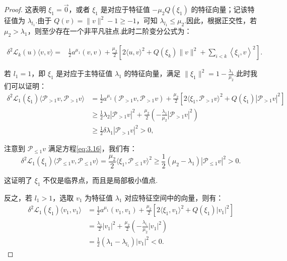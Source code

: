 \begin{proof}
这表明 $\xi_{1}=\vec{0}$，或者 $\xi_{1}$ 是对应于特征值 $-\mu_{2}Q(\xi_{1})$ 的特征向量；记该特征值为 $\lambda_{l_{1}}$.由于 $Q(v)=\|v\|^{2}-1\geq -1$，可知 $\lambda_{l_{1}}\leq \mu_{2}$.因此，根据正交性，若 $\mu_{2}>\lambda_{1}$，则至少存在一个非平凡驻点.此时二阶变分公式为：

\begin{equation*}
\begin{aligned}
\delta^{2} \mathcal{L}_{k}(u)\langle v,v\rangle=& \frac{1}{2}a^{\mu_{1}}(v,v) +\frac{\mu_{2}}{2}\left[2\langle u, v\rangle^{2}+Q(\xi_{k})\|v\|^{2}+\sum_{i<k}\left\langle\xi_{i}, v\right\rangle^{2}\right].
\end{aligned}
\end{equation*}

若 $l_{1}=1$，即 $\xi_{1}$ 是对应于主特征值 $\lambda_{1}$ 的特征向量，满足 $\|\xi_{1}\|^2=1-\frac{\lambda_{1}}{\mu_{2}}$.此时我们可以证明：
$$\begin{aligned}
\delta^{2} \mathcal{L}_{1}(\xi_1)\langle\mathcal{P}_{>1}v,\mathcal{P}_{>1}v\rangle
&=\frac{1}{2}a^{\mu_{1}}(\mathcal{P}_{>1}v,\mathcal{P}_{>1}v)+\frac{\mu_{2}}{2}\left[2\langle\xi_1, \mathcal{P}_{>1}v\rangle^{2}+Q(\xi_{1})|\mathcal{P}_{>1}v|^{2}\right]\\
&\geq\frac{1}{2}\lambda_{2}|\mathcal{P}_{>1}v|^{2}+\frac{\mu_{2}}{2}\left(-\frac{\lambda_{1}}{\mu_{2}}|\mathcal{P}_{>1}v|^{2}\right)\\
&\geq\frac{1}{2}\delta\lambda_{1}|\mathcal{P}_{>1}v|^{2}>0,
\end{aligned}$$

注意到 $\mathcal{P}_{\leq 1}v$ 满足方程\eqref{eq:3.16}，我们有：
\begin{equation}\label{eq:3.20}
\delta^{2} \mathcal{L}_{1}(\xi_1)\langle\mathcal{P}_{\leq 1}v,\mathcal{P}_{\leq 1}v\rangle=\frac{\mu_2}{2}\langle\xi_1, \mathcal{P}_{\leq1}v\rangle^{2}\geq\frac{1}{2}(\mu_2-\lambda_{1})|\mathcal{P}_{\leq 1}v|^{2}>0.
\end{equation}

这证明了 $\xi_1$ 不仅是临界点，而且是局部极小值点.

反之，若 $l_{1}> 1$，选取 $v_{1}$ 为特征值 $\lambda_{1}$ 对应特征空间中的向量，则有：
$$\begin{aligned}
\delta^{2} \mathcal{L}_{1}(\xi_1)\langle v_{1},v_{1}\rangle&=\frac{1}{2}a^{\mu_{1}}(v_{1},v_{1})+\frac{\mu_{2}}{2}\left[2\langle \xi_{1}, v_{1}\rangle^{2}+Q(\xi_{1})|v_{1}|^{2}\right]\\
&=\frac{\lambda_{1}}{2}|v_{1}|^{2} +\frac{\mu_{2}}{2}\left(-\frac{\lambda_{l_{1}}}{\mu_{2}}|v_{1}|^{2}\right)\\
&=\frac{1}{2}(\lambda_{1}-\lambda_{l_1})|v_{1}|^{2}< 0.
\end{aligned}$$


\end{proof}
